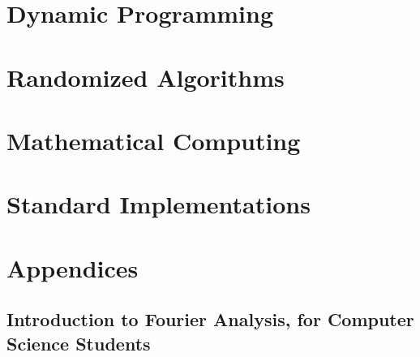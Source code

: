\documentclass{book}
\newcommand{\LoadSection}[1]{{}}
\newcommand{\LoadAppendix}[1]{{}}
\begin{document}
\newpage
\chapter{Dynamic Programming}
\label{cha:dp}

    \LoadSection{dynamic-programming/intro}
    \LoadSection{dynamic-programming/fibonacci-sequence}
    \LoadSection{dynamic-programming/01-knapsack-problem}

\newpage
\chapter{Randomized Algorithms}
\label{cha:randomized-algorithms}

    \LoadSection{randomized-algorithms/intro}

\newpage
\chapter{Mathematical Computing}
\label{cha:mathematical-computing}

    \LoadSection{mathematical-computing/intro}

\newpage
\chapter{Standard Implementations}
\label{cha:standard-implementations}

    \LoadSection{standard-implementations/javascript/intro}
    \newpage
    \LoadSection{standard-implementations/javascript/max-heap-implementation}
    \newpage
    \LoadSection{standard-implementations/python}

\appendix
\chapter{Appendices}

\section{Introduction to Fourier Analysis, for Computer Science Students}
\label{sec:appendix--fourier}

    \LoadAppendix{intro-to-fourier-analysis/background}

%
\end{document}
